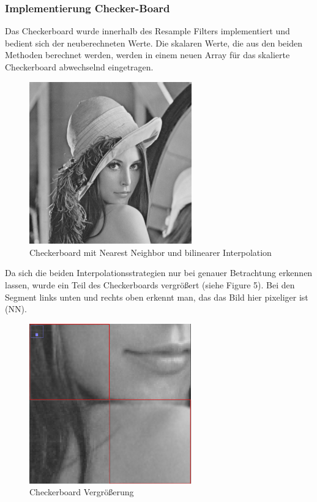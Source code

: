\documentclass[12pt,german]{article}
\begin{document}
\subsubsection{Implementierung Checker-Board}

Das Checkerboard wurde innerhalb des Resample Filters implementiert und bedient sich der neuberechneten Werte. Die skalaren Werte, die aus den beiden Methoden berechnet werden, werden in einem neuen Array für das skalierte Checkerboard abwechselnd eingetragen.\\

\begin{figure}[H]
	\centering
	\includegraphics[width=7cm]{images/bilineare-interpolation-final/scaled-img-checkerboard.jpg}
	\caption{Checkerboard mit Nearest Neighbor und bilinearer Interpolation}
	\label{fig:resultCheckerboard}
\end{figure}

Da sich die beiden Interpolationsstrategien nur bei genauer Betrachtung erkennen lassen, wurde ein Teil des Checkerboards vergrößert (siehe Figure 5). Bei den Segment links unten und rechts oben erkennt man, das das Bild hier pixeliger ist (NN).

\begin{figure}[H]
	\centering
	\includegraphics[width=7cm]{images/bilineare-interpolation-final/scaled-img_checkerboard-NN-BI-boxes.png}
	\caption{Checkerboard Vergrößerung}
	\label{fig:resultCheckerboardZoom}
\end{figure}
\end{document}
